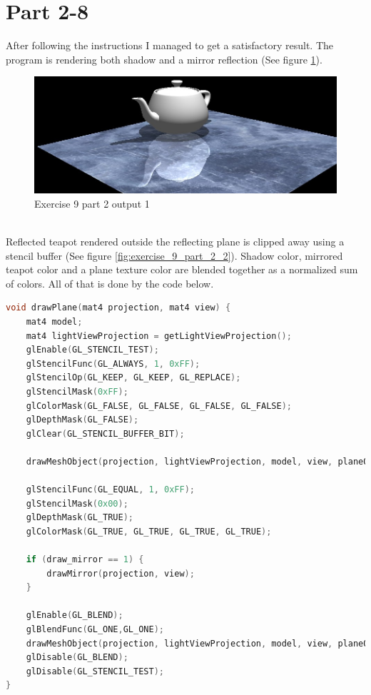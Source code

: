 \section{Part 2-8}
After following the instructions I managed to get a satisfactory result. 
The program is rendering both shadow and a mirror reflection (See figure \ref{fig:exercise_9_part_2_1}).
\begin{figure}[ht!]
	\begin{center}
		\includegraphics[width=.85\textwidth]{figures/exercise_9_part_2_1}
	\end{center}
	\vspace{-4.5ex}\caption{Exercise 9 part 2 output 1}
	\label{fig:exercise_9_part_2_1} 
\end{figure} \\
\newline
Reflected teapot rendered outside the reflecting plane is clipped away using 
a stencil buffer (See figure \ref{fig:exercise_9_part_2_2}). 
Shadow color, mirrored teapot color and a plane texture color are blended 
together as a normalized sum of colors. All of that is done by the code below.
\begin{lstlisting}[language=cpp, caption={drawPlane function}]
void drawPlane(mat4 projection, mat4 view) {
	mat4 model;
	mat4 lightViewProjection = getLightViewProjection();
	glEnable(GL_STENCIL_TEST);
    glStencilFunc(GL_ALWAYS, 1, 0xFF);
    glStencilOp(GL_KEEP, GL_KEEP, GL_REPLACE);
    glStencilMask(0xFF); 
	glColorMask(GL_FALSE, GL_FALSE, GL_FALSE, GL_FALSE);
    glDepthMask(GL_FALSE); 
    glClear(GL_STENCIL_BUFFER_BIT); 

	drawMeshObject(projection, lightViewProjection, model, view, planeObject);	

	glStencilFunc(GL_EQUAL, 1, 0xFF); 
    glStencilMask(0x00);
    glDepthMask(GL_TRUE);
	glColorMask(GL_TRUE, GL_TRUE, GL_TRUE, GL_TRUE);

	if (draw_mirror == 1) {
		drawMirror(projection, view);	
	}

	glEnable(GL_BLEND);
	glBlendFunc(GL_ONE,GL_ONE);
	drawMeshObject(projection, lightViewProjection, model, view, planeObject);
	glDisable(GL_BLEND);
	glDisable(GL_STENCIL_TEST);
}
\end{lstlisting}
